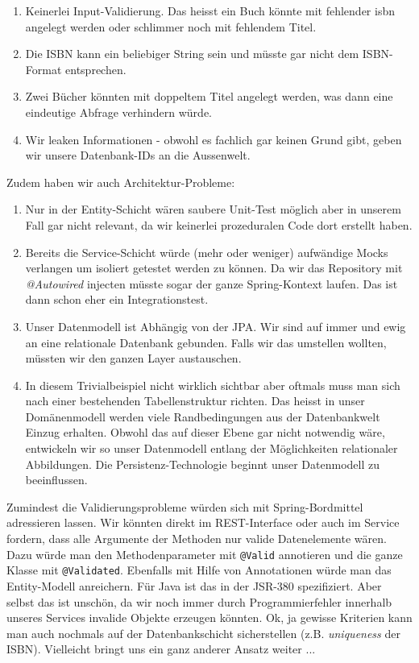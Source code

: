 \begin{enumerate}
    \item Keinerlei Input-Validierung. Das heisst ein Buch könnte mit fehlender
    isbn angelegt werden oder schlimmer noch mit fehlendem Titel.
    \item Die ISBN kann ein beliebiger String sein und müsste gar nicht
    dem ISBN-Format entsprechen.
    \item Zwei Bücher könnten mit doppeltem Titel angelegt werden, was dann eine
    eindeutige Abfrage verhindern würde.
    \item Wir leaken Informationen - obwohl es fachlich gar keinen Grund gibt,
    geben wir unsere Datenbank-IDs an die Aussenwelt.
\end{enumerate}

Zudem haben wir auch Architektur-Probleme:

\begin{enumerate}
    \item Nur in der Entity-Schicht wären saubere Unit-Test möglich aber
    in unserem Fall gar nicht relevant, da wir keinerlei prozeduralen
    Code dort erstellt haben.
    \item Bereits die Service-Schicht würde (mehr oder weniger) aufwändige
    Mocks verlangen um isoliert getestet werden zu können. Da wir das
    Repository mit \textit{@Autowired} injecten müsste sogar der ganze
    Spring-Kontext laufen. Das ist dann schon eher ein Integrationstest.
    \item Unser Datenmodell ist Abhängig von der JPA. Wir sind auf immer
    und ewig an eine relationale Datenbank gebunden. Falls wir das 
    umstellen wollten, müssten wir den ganzen Layer austauschen.
    \item In diesem Trivialbeispiel nicht wirklich sichtbar aber oftmals
    muss man sich nach einer bestehenden Tabellenstruktur richten. Das heisst
    in unser Domänenmodell werden viele Randbedingungen aus der Datenbankwelt
    Einzug erhalten. Obwohl das auf dieser Ebene gar nicht notwendig wäre,
    entwickeln wir so unser Datenmodell entlang der Möglichkeiten relationaler
    Abbildungen. Die Persistenz-Technologie beginnt unser Datenmodell zu
    beeinflussen.
\end{enumerate}

Zumindest die Validierungsprobleme würden sich mit Spring-Bordmittel
adressieren lassen. Wir könnten direkt im REST-Interface
oder auch im Service fordern, dass alle Argumente der Methoden nur
valide Datenelemente wären. Dazu würde man den Methodenparameter mit
\texttt{@Valid} annotieren und die ganze Klasse mit \texttt{@Validated}.
Ebenfalls mit Hilfe von Annotationen würde man das Entity-Modell
anreichern. Für Java ist das in der JSR-380 \cite{jsr380} spezifiziert.
Aber selbst das ist unschön, da wir noch immer durch Programmierfehler
innerhalb unseres Services invalide Objekte erzeugen könnten. Ok, ja
gewisse Kriterien kann man auch nochmals auf der Datenbankschicht
sicherstellen (z.B. \textit{uniqueness} der ISBN). Vielleicht bringt
uns ein ganz anderer Ansatz weiter ...

